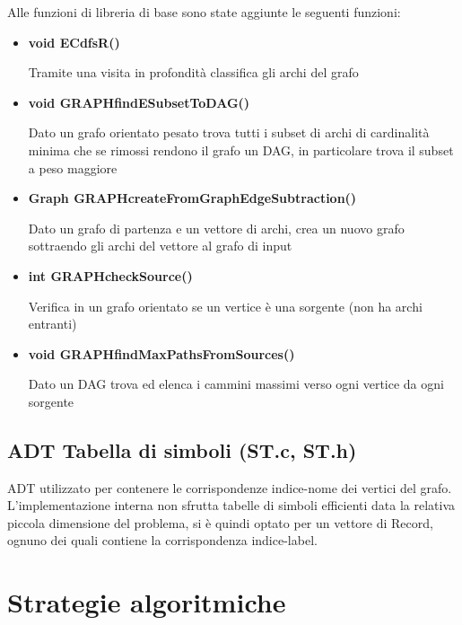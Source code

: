 \documentclass[11pt, a4paper, titlepage]{article}
\begin{document}
            Alle funzioni di libreria di base sono state aggiunte le seguenti funzioni: 

            \begin{itemize}
                \item \textbf{void ECdfsR()} 
                
                Tramite una visita in profondità classifica gli archi del grafo

                \item \textbf{void GRAPHfindESubsetToDAG()}
                
                Dato un grafo orientato pesato trova tutti i subset di archi di cardinalità minima che se rimossi rendono il grafo un DAG, in particolare trova il subset a peso maggiore

                \item \textbf{Graph GRAPHcreateFromGraphEdgeSubtraction()}
                
                Dato un grafo di partenza e un vettore di archi, crea un nuovo grafo sottraendo gli archi del vettore al grafo di input

                \item \textbf{int GRAPHcheckSource()}
                
                Verifica in un grafo orientato se un vertice è una sorgente (non ha archi entranti)

                \item \textbf{void GRAPHfindMaxPathsFromSources()}
                
                Dato un DAG trova ed elenca i cammini massimi verso ogni vertice da ogni sorgente

            \end{itemize}

        \subsection{ADT Tabella di simboli (ST.c, ST.h)}
            ADT utilizzato per contenere le corrispondenze indice-nome dei vertici del grafo. L'implementazione interna non sfrutta tabelle
            di simboli efficienti data la relativa piccola dimensione del problema, si è quindi optato per un vettore di Record, ognuno dei quali contiene la corrispondenza indice-label.

    \section{Strategie algoritmiche}
\end{document}
